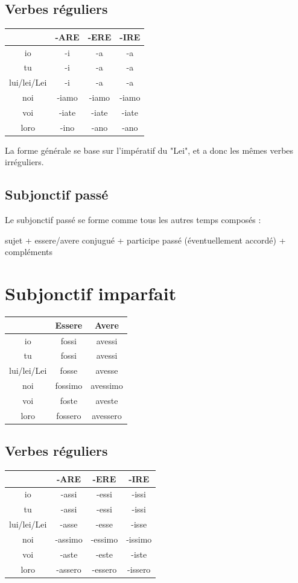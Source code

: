\documentclass[12pt, openany]{report}
\begin{document}
\subsection{Verbes réguliers}
\begin{center}
    \begin{tabular}{c|c|c|c}
        & -ARE & -ERE & -IRE \\ \hline 
        io & -i & -a & -a \\
        tu & -i & -a & -a \\
        lui/lei/Lei & -i & -a & -a\\
        noi & -iamo & -iamo & -iamo \\
        voi & -iate & -iate & -iate \\
        loro & -ino & -ano & -ano
    \end{tabular}
\end{center}
La forme générale se base sur l'impératif du "Lei", et a donc les mêmes verbes irréguliers. 
\subsection{Subjonctif passé}
Le subjonctif passé se forme comme tous les autres temps composés : 
\begin{center}
    sujet + essere/avere conjugué + participe passé (éventuellement accordé) + compléments 
\end{center}
\section{Subjonctif imparfait}
\begin{center}
    \begin{tabular}{c|c|c}
        & Essere & Avere \\ \hline 
        io & fossi & avessi \\
        tu & fossi & avessi \\
        lui/lei/Lei & fosse & avesse \\
        noi & fossimo & avessimo \\
        voi & foste & aveste \\
        loro & fossero & avessero
    \end{tabular}
\end{center}
\subsection{Verbes réguliers}
\begin{center}
    \begin{tabular}{c|c|c|c}
        & -ARE & -ERE & -IRE \\ \hline 
        io & -assi & -essi & -issi \\
        tu & -assi & -essi & -issi \\
        lui/lei/Lei & -asse & -esse & -isse\\
        noi & -assimo & -essimo & -issimo \\
        voi & -aste & -este & -iste \\
        loro & -assero & -essero & -issero
    \end{tabular}
\end{center}
\end{document}
